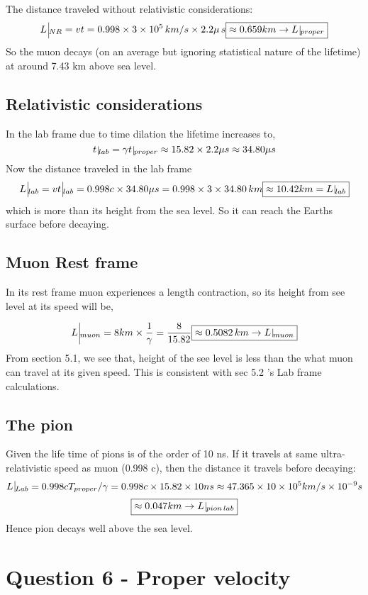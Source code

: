 \documentclass[11pt]{article}
\begin{document}
	The distance traveled without relativistic considerations:
	\[
		L\, \vline_{NR}= vt = 0.998 \times 3\times 10^5 \,km/s \times 2.2 \mu\,s \boxed{\approx 0.659 km \rightarrow L \, \vline_{proper}}
	\]
	So the muon decays (on an average but ignoring statistical nature of the lifetime) at around 7.43 km above sea level.
	
	\subsection{Relativistic considerations}
	
	In the lab frame due to time dilation the lifetime increases to,
	\[
		t \,\vline_{lab} = \gamma t \,\vline_{proper} \approx 15.82 \times 2.2 \mu s \approx 34.80 \mu s
	\]
	Now the distance traveled in the lab frame
	\[
		L \, \vline_{lab} = vt \, \vline_{lab} = 0.998 c \times 34.80 \mu s = 0.998 \times 3 \times 34.80 \, km \boxed{\approx 10.42 km = L \, \vline_{lab}}
	\]
	which is more than its height from the sea level. So it can  reach the Earths surface before decaying.
	
	\subsection{Muon Rest frame}
	
	In its rest frame muon experiences a length contraction, so its height from see level at its speed will be,
	
	\[
		L \, \vline_{muon} = 8km \times \frac{1}{\gamma} = \frac{8}{15.82} \boxed{\approx 0.5082 \, km \rightarrow L \, \vline_{muon}}
	\]
	From section 5.1, we see that, height of the see level is less than the what muon can travel at its given speed. This is consistent with sec 5.2 's Lab frame calculations.
		
	\subsection{The pion}
	
	Given the life time of pions is of the order of 10 ns. If it travels at same ultra-relativistic speed as muon (0.998 c), then the distance it travels before decaying:
	\[
		L \, \vline_{Lab} = 0.998c T_{proper}/\gamma = 0.998 c \times 15.82 \times 10 ns \approx 47.365 \times 10 \times 10^5 km/s \times 10^{-9}s 
	\]
	\[
		\boxed{\approx 0.047 km \rightarrow L \, \vline_{pion \, lab}}
	\]
	Hence pion decays well above the sea level.
	
	\section{\color{teal} Question 6 - Proper velocity}
	
\end{document}
